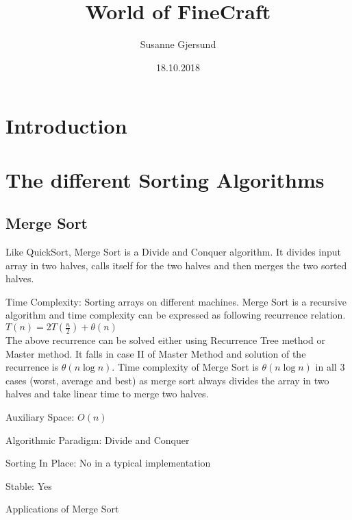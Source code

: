 \documentclass{article}
\title{World of FineCraft}
\author{Susanne Gjersund}
\date{18.10.2018}
\begin{document}
	
	
	\maketitle
	\newpage
	\maketitle
	\tableofcontents
	\newpage


\section{Introduction}
	





\section{The different Sorting Algorithms}


\subsection{Merge Sort}


Like QuickSort, Merge Sort is a Divide and Conquer algorithm. It divides input array in two halves, calls itself for the two halves and then merges the two sorted halves.

Time Complexity: Sorting arrays on different machines. Merge Sort is a recursive algorithm and time complexity can be expressed as following recurrence relation. \\
$T(n) = 2T(\frac{n}{2}) + \theta(n)$ \\
The above recurrence can be solved either using Recurrence Tree method or Master method. It falls in case II of Master Method and solution of the recurrence is $\theta(n\log n)$.
Time complexity of Merge Sort is $\theta(n\log n)$ in all 3 cases (worst, average and best) as merge sort always divides the array in two halves and take linear time to merge two halves.

Auxiliary Space: $O(n)$

Algorithmic Paradigm: Divide and Conquer

Sorting In Place: No in a typical implementation

Stable: Yes

Applications of Merge Sort
\end{document}
